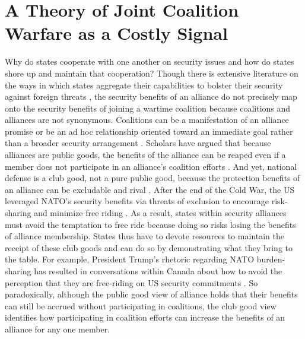 \documentclass[12pt,letterpaper]{article}
\begin{document}
\section{A Theory of Joint Coalition Warfare as a Costly Signal}
	Why do states cooperate with one another on security issues and how do states shore up and maintain that cooperation? Though there is extensive literature on the ways in which states aggregate their capabilities to bolster their security against foreign threats \citep{waltz_theoryinternationalpolitics_1979, walt_originsalliance_1987, morrow_alliancesasymmetryalternative_1991, conybeare_portfoliodiversificationmodel_1992}, the security benefits of an alliance do not precisely map onto the security benefits of joining a wartime coalition because coalitions and alliances are not synonymous. Coalitions can be a manifestation of an alliance promise or be an ad hoc relationship oriented toward an immediate goal rather than a broader security arrangement \citep[115]{weitsman_wartimealliancescoalition_2010}. Scholars have argued that because alliances are public goods, the benefits of the alliance can be reaped even if a member does not participate in an alliance's coalition efforts \citep{olson_economictheoryalliances_1966}. And yet, national defense is a club good, not a pure public good, because the protection benefits of an alliance can be excludable and rival \citep[336]{sandler_clubtheorythirty_1997}. After the end of the Cold War, the US leveraged NATO's security benefits via threats of exclusion to encourage risk-sharing and minimize free riding \citep[324-325]{ringsmose_natoburdensharingredux_2010}. As a result, states within security alliances must avoid the temptation to free ride because doing so risks losing the benefits of alliance membership. States thus have to devote resources to maintain the receipt of these club goods and can do so by demonstrating what they bring to the table. For example, President Trump's rhetoric regarding NATO burden-sharing has resulted in conversations within Canada about how to avoid the perception that they are free-riding on US security commitments \citep[143]{mckay_whycanadabest_2018}. So paradoxically, although the public good view of alliance holds that their benefits can still be accrued without participating in coalitions, the club good view identifies how participating in coalition efforts can increase the benefits of an alliance for any one member.
	
\end{document}
